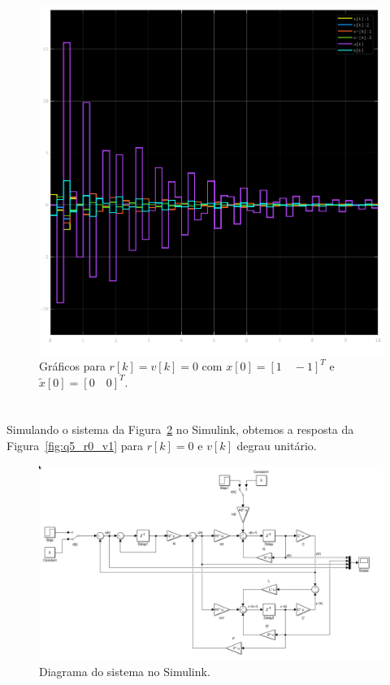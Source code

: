 \documentclass{article}
\begin{document}
    \begin{figure}[H]
        \centering
        \includegraphics[width=.6\linewidth]{images/q4_r0_v0.png}
        \caption{Gráficos para $r[k]=v[k]=0$ com $x[0] = [1\quad -1]^T$ e $\tilde{x}[0] = [0\quad 0]^T$.}\label{fig:q4_r0_v0}
    \end{figure}


\section{\normalsize {}}


    {Simulando o sistema da Figura~\ref{fig:simulink_q5} no Simulink, obtemos a
    resposta da Figura~\ref{fig:q5_r0_v1} para $r[k]=0$ e $v[k]$ degrau unitário.}

    \begin{figure}[H]
        \centering
        \includegraphics[width=.8\linewidth]{images/simulink_q5.png}
        \caption{Diagrama do sistema no Simulink.}\label{fig:simulink_q5}
    \end{figure}
\end{document}
